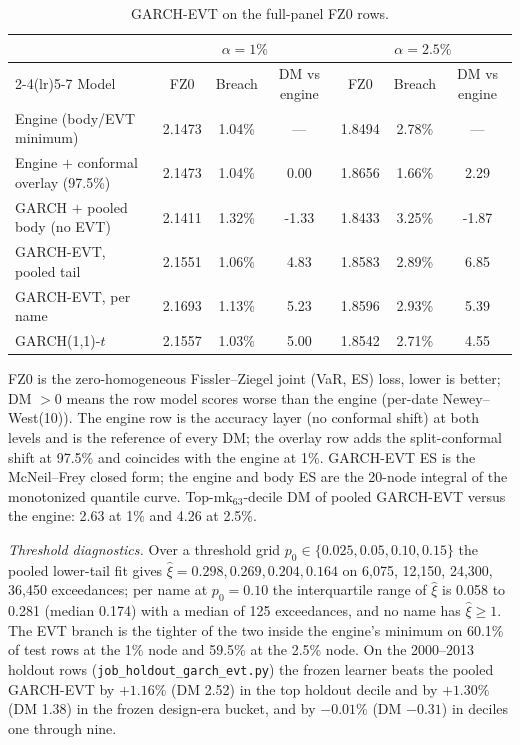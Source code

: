 \documentclass[11pt]{article}
\begin{document}
\begin{table}[htbp]
\centering
\begin{threeparttable}
\caption{GARCH-EVT on the full-panel FZ0 rows.}
\label{tab:garchevt-fz0}
\small
\begin{tabular}{lcccccc}
\toprule
& \multicolumn{3}{c}{$\alpha=1\%$} & \multicolumn{3}{c}{$\alpha=2.5\%$} \\
\cmidrule(lr){2-4}\cmidrule(lr){5-7}
Model & FZ0 & Breach & DM vs engine & FZ0 & Breach & DM vs engine \\
\midrule
Engine (body/EVT minimum) & 2.1473 & 1.04\% & --- & 1.8494 & 2.78\% & --- \\
Engine $+$ conformal overlay (97.5\%) & 2.1473 & 1.04\% & 0.00 & 1.8656 & 1.66\% & 2.29 \\
GARCH $+$ pooled body (no EVT) & 2.1411 & 1.32\% & -1.33 & 1.8433 & 3.25\% & -1.87 \\
GARCH-EVT, pooled tail & 2.1551 & 1.06\% & 4.83 & 1.8583 & 2.89\% & 6.85 \\
GARCH-EVT, per name & 2.1693 & 1.13\% & 5.23 & 1.8596 & 2.93\% & 5.39 \\
GARCH(1,1)-$t$ & 2.1557 & 1.03\% & 5.00 & 1.8542 & 2.71\% & 4.55 \\
\bottomrule
\end{tabular}
\begin{tablenotes}\footnotesize
\item FZ0 is the zero-homogeneous Fissler--Ziegel joint (VaR, ES) loss, lower is better; DM $>0$ means the row model scores worse than the engine (per-date Newey--West(10)). The engine row is the accuracy layer (no conformal shift) at both levels and is the reference of every DM; the overlay row adds the split-conformal shift at 97.5\% and coincides with the engine at 1\%. GARCH-EVT ES is the McNeil--Frey closed form; the engine and body ES are the 20-node integral of the monotonized quantile curve. Top-$\mathrm{mk}_{63}$-decile DM of pooled GARCH-EVT versus the engine: 2.63 at 1\% and 4.26 at 2.5\%.
\end{tablenotes}
\end{threeparttable}
\end{table}

\noindent\emph{Threshold diagnostics.} Over a threshold grid $p_0\in\{0.025,0.05,0.10,0.15\}$ the pooled lower-tail fit gives $\hat\xi=0.298, 0.269, 0.204, 0.164$ on 6,075, 12,150, 24,300, 36,450 exceedances; per name at $p_0=0.10$ the interquartile range of $\hat\xi$ is 0.058 to 0.281 (median 0.174) with a median of 125 exceedances, and no name has $\hat\xi\ge1$. The EVT branch is the tighter of the two inside the engine's minimum on 60.1\% of test rows at the 1\% node and 59.5\% at the 2.5\% node. On the 2000--2013 holdout rows (\texttt{job\_holdout\_garch\_evt.py}) the frozen learner beats the pooled GARCH-EVT by $+1.16\%$ (DM 2.52) in the top holdout decile and by $+1.30\%$ (DM 1.38) in the frozen design-era bucket, and by $-0.01\%$ (DM $-0.31$) in deciles one through nine.
\end{document}
